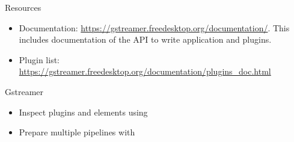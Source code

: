 \begin{frame}{Resources}
  \begin{itemize}
  \item Documentation:
    \url{https://gstreamer.freedesktop.org/documentation/}. This
    includes documentation of the API to write application and
    plugins.
  \item Plugin list:
    \url{https://gstreamer.freedesktop.org/documentation/plugins_doc.html}
  \end{itemize}
\end{frame}

\setupdemoframe
{Gstreamer}
{
  \begin{itemize}
  \item Inspect plugins and elements using 
  \item Prepare multiple pipelines with 
  \end{itemize}
}
